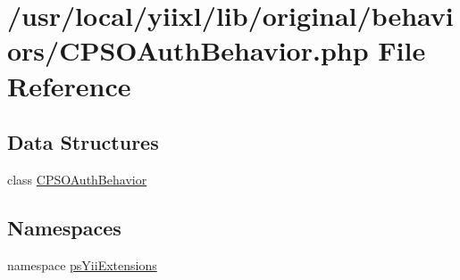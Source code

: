 \hypertarget{CPSOAuthBehavior_8php}{
\section{/usr/local/yiixl/lib/original/behaviors/CPSOAuthBehavior.php File Reference}
\label{CPSOAuthBehavior_8php}
}
\subsection*{Data Structures}
\begin{DoxyCompactItemize}
\item 
class \hyperlink{classCPSOAuthBehavior}{CPSOAuthBehavior}
\end{DoxyCompactItemize}
\subsection*{Namespaces}
\begin{DoxyCompactItemize}
\item 
namespace \hyperlink{namespacepsYiiExtensions}{psYiiExtensions}
\end{DoxyCompactItemize}
